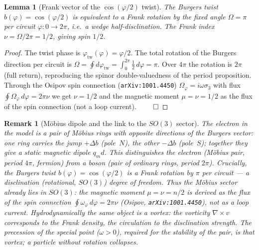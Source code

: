 \documentclass[12pt,a4paper]{article}
\newtheorem{lemma}{Lemma}
\newtheorem{remark}{Remark}
\begin{document}
\begin{lemma}[Frank vector of the $\cos(\varphi/2)$ twist]
\label{lem:franck}
The Burgers twist $b(\varphi)=\cos(\varphi/2)$ is equivalent to a Frank
rotation by the fixed angle $\Omega=\pi$ per circuit $\varphi:0\to2\pi$, i.e.\ a
wedge \emph{half-disclination}. The Frank index $\nu=\Omega/2\pi=1/2$, giving
spin $1/2$.
\end{lemma}
\begin{proof}
The twist phase is $\varphi_{\text{tw}}(\varphi)=\varphi/2$. The total rotation
of the Burgers direction per circuit is
$\Omega=\oint d\varphi_{\text{tw}}=\int_0^{2\pi}\tfrac12\,d\varphi=\pi$. Over
$4\pi$ the rotation is $2\pi$ (full return), reproducing the spinor
double-valuedness of the period proposition. Through the Osipov spin connection
(\texttt{arXiv:1001.4450}) $\Omega_\varphi=i\omega\sigma_3$ with flux
$\oint\Omega_\varphi\,d\varphi=2\pi\nu$ we get $\nu=1/2$ and the magnetic moment
$\mu=\nu=1/2$ as the flux of the spin connection (not a loop current). $\qed$
\end{proof}

\begin{remark}[M\"obius dipole and the link to the $SO(3)$ sector]
The electron in the model is a pair of M\"obius rings with \emph{opposite}
directions of the Burgers vector: one ring carries the jump $+\Delta b$
(pole~$N$), the other $-\Delta b$ (pole~$S$); together they give a static
magnetic dipole $q_m d$. This distinguishes the electron (M\"obius pair, period
$4\pi$, fermion) from a boson (pair of ordinary rings, period $2\pi$).
Crucially, the Burgers twist $b(\varphi)=\cos(\varphi/2)$ is a Frank rotation by
$\pi$ per circuit --- a \emph{disclination} (rotational, $SO(3)$) degree of
freedom. Thus the M\"obius sector already lies in $SO(3)$: the magnetic moment
$\mu=\nu=n/2$ is derived as the flux of the spin connection
$\oint\omega_\varphi\,d\varphi=2\pi\nu$ (Osipov, \texttt{arXiv:1001.4450}),
not as a loop current. Hydrodynamically the same object is a vortex: the
vorticity $\nabla\times v$ corresponds to the Frank density, the circulation to
the disclination strength. The precession of the special point ($\omega>0$),
required for the stability of the pair, is that vortex; a particle without
rotation collapses.
\end{remark}
\end{document}
